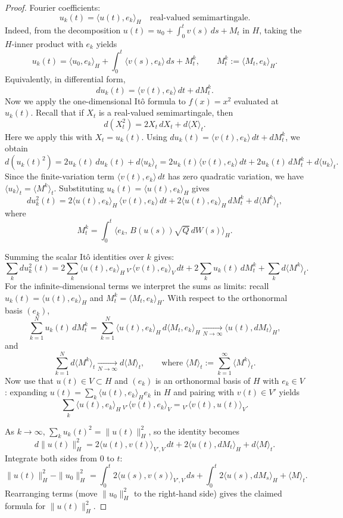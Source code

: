 \documentclass[11pt]{article}
\theoremstyle{definition}
\theoremstyle{remark}
\begin{document}
\medskip
\noindent
\begin{proof}
Fourier coefficients:
\[
u_{k}(t)=\langle u(t),e_{k}\rangle_{H}
\quad \text{real-valued semimartingale.}
\]
Indeed, from the decomposition \(u(t)=u_{0}+\int_{0}^{t}v(s)\,ds+M_{t}\) in \(H\), taking the \(H\)-inner product with \(e_{k}\) yields
\[
u_{k}(t)=\langle u_{0},e_{k}\rangle_{H}+\int_{0}^{t}\langle v(s),e_{k}\rangle\,ds+M_{t}^{k},
\qquad
M_{t}^{k}:=\langle M_{t},e_{k}\rangle_{H}.
\]
Equivalently, in differential form,
\[
du_{k}(t)=\langle v(t),e_{k}\rangle\,dt+dM_{t}^{k}.
\]
Now we apply the one-dimensional It\^o formula to \(f(x)=x^{2}\) evaluated at \(u_{k}(t)\).
Recall that if \(X_t\) is a real-valued semimartingale, then
\[
d(X_t^{2})=2X_t\,dX_t+d\langle X\rangle_t.
\]
Here we apply this with \(X_t=u_k(t)\).
Using \(du_k(t)=\langle v(t),e_k\rangle\,dt+dM_t^k\), we obtain
\[
d(u_k(t)^2)
=2u_k(t)\,du_k(t)+d\langle u_k\rangle_t
=2u_k(t)\langle v(t),e_k\rangle\,dt+2u_k(t)\,dM_t^k+d\langle u_k\rangle_t.
\]
Since the finite-variation term \(\langle v(t),e_k\rangle\,dt\) has zero quadratic variation, we have \(\langle u_k\rangle_t=\langle M^k\rangle_t\).
Substituting \(u_k(t)=\langle u(t),e_k\rangle_H\) gives
\[
d u_{k}^{2}(t)
=2\langle u(t),e_{k}\rangle_{H}\,\langle v(t),e_{k}\rangle\,dt
+2\langle u(t),e_{k}\rangle_{H}\,dM_{t}^{k}
+d\langle M^{k}\rangle_{t},
\]
where
\[
M_{t}^{k}=\int_{0}^{t}\langle e_{k},\,B(u(s))\sqrt{Q}\,dW(s)\rangle_{H}.
\]

Summing the scalar It\^o identities over \(k\) gives:
\[
\sum_{k}d u_{k}^{2}(t)
=2\sum_{k}\langle u(t),e_{k}\rangle_{H}\,{}_{V'}\langle v(t),e_{k}\rangle_{V}\,dt
+2\sum_{k}u_{k}(t)\,dM_{t}^{k}
+\sum_{k}d\langle M^{k}\rangle_{t}.
\]
\noindent
For the infinite-dimensional terms we interpret the sums as limits: recall \(u_k(t)=\langle u(t),e_k\rangle_H\) and \(M_t^k=\langle M_t,e_k\rangle_H\). With respect to the orthonormal basis \((e_k)\),
\[
\sum_{k=1}^{N}u_k(t)\,dM_t^k
=\sum_{k=1}^{N}\langle u(t),e_k\rangle_H\,d\langle M_t,e_k\rangle_H
\xrightarrow[N\to\infty]{}\langle u(t),dM_t\rangle_H,
\]
and
\[
\sum_{k=1}^{N}d\langle M^{k}\rangle_{t}\xrightarrow[N\to\infty]{}d\langle M\rangle_t,
\qquad
\text{where }\langle M\rangle_t:=\sum_{k=1}^{\infty} \langle M^k\rangle_t.
\]
Now use that \(u(t)\in V\subset H\) and \((e_k)\) is an orthonormal basis of \(H\) with \(e_k\in V\): expanding \(u(t)=\sum_k \langle u(t),e_k\rangle_H e_k\) in \(H\) and pairing with \(v(t)\in V'\) yields
\[
\sum_{k}\langle u(t),e_{k}\rangle_{H}\,{}_{V'}\langle v(t),e_{k}\rangle_{V}
={}_{V'}\langle v(t),u(t)\rangle_{V}.
\]

As \(k\to\infty\), \(\sum_k u_k(t)^2=\|u(t)\|_H^2\), so the identity becomes
\[
d\|u(t)\|_H^2
=2\langle u(t),v(t)\rangle_{V',V}\,dt
+2\langle u(t),dM_{t}\rangle_{H}
+d\langle M\rangle_{t}.
\]
\noindent
Integrate both sides from \(0\) to \(t\):
\[
\|u(t)\|_{H}^{2}-\|u_{0}\|_{H}^{2}
=\int_{0}^{t}2\langle u(s),v(s)\rangle_{V',V}\,ds
+\int_{0}^{t}2\langle u(s),dM_{s}\rangle_{H}
+\langle M\rangle_{t}.
\]
\noindent
Rearranging terms (move \(\|u_{0}\|_{H}^{2}\) to the right-hand side) gives the claimed formula for \(\|u(t)\|_{H}^{2}\).
\qedhere
\end{proof}
\end{document}
